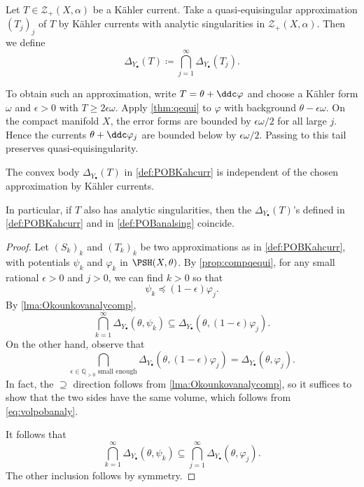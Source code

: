 \begin{definition}\label{def:POBKahcurr}
     Let $T\in \mathcal{Z}_+(X,\alpha)$ be a Kähler current. Take a quasi-equisingular approximation $(T_j)_j$ of $T$ by Kähler currents with analytic singularities in $\mathcal{Z}_+(X,\alpha)$. Then we define
    \[
        \Delta_{Y_{\bullet}}(T)\coloneqq \bigcap_{j=1}^{\infty}\Delta_{Y_{\bullet}}(T_j).
    \]
\end{definition}

To obtain such an approximation, write $T=\theta+\ddc\varphi$ and choose a Kähler form $\omega$ and $\epsilon>0$ with $T\geq 2\epsilon\omega$. Apply \cref{thm:qequi} to $\varphi$ with background $\theta-\epsilon\omega$. On the compact manifold $X$, the error forms are bounded by $\epsilon\omega/2$ for all large $j$. Hence the currents $\theta+\ddc\varphi_j$ are bounded below by $\epsilon\omega/2$. Passing to this tail preserves quasi-equisingularity.

\begin{lemma}\label{lma:Okounkov:L1517}
    The convex body $\Delta_{Y_{\bullet}}(T)$ in \cref{def:POBKahcurr} is independent of the chosen approximation by Kähler currents.
\end{lemma}
In particular, if $T$ also has analytic singularities, then the $\Delta_{Y_{\bullet}}(T)$'s defined in \cref{def:POBKahcurr} and in \cref{def:POBanalsing} coincide.
\begin{proof}
    Let $(S_k)_k$ and $(T_k)_k$ be two approximations as in \cref{def:POBKahcurr}, with potentials $\psi_k$ and $\varphi_k$ in $\PSH(X,\theta)$. By \cref{prop:compqequi}, for any small rational $\epsilon>0$ and $j>0$, we can find $k>0$ so that
    \[
        \psi_k\preceq (1-\epsilon)\varphi_j.
    \]
    By \cref{lma:Okounkovanalycomp},
    \[
    \bigcap_{k=1}^{\infty}\Delta_{Y_{\bullet}}(\theta,\psi_k)\subseteq \Delta_{Y_{\bullet}}(\theta,(1-\epsilon)\varphi_j).
    \]
    On the other hand, observe that
    \[
    \bigcap_{\epsilon\in \mathbb{Q}_{>0}\text{ small enough}}\Delta_{Y_{\bullet}}(\theta,(1-\epsilon)\varphi_j)=\Delta_{Y_{\bullet}}(\theta,\varphi_j).
    \]
    In fact, the $\supseteq$ direction follows from \cref{lma:Okounkovanalycomp}, so it suffices to show that the two sides have the same volume, which follows from \eqref{eq:volpobanaly}.

    It follows that
    \[
    \bigcap_{k=1}^{\infty}\Delta_{Y_{\bullet}}(\theta,\psi_k)\subseteq \bigcap_{j=1}^{\infty}\Delta_{Y_{\bullet}}(\theta,\varphi_j).
    \]
    The other inclusion follows by symmetry.
\end{proof}

